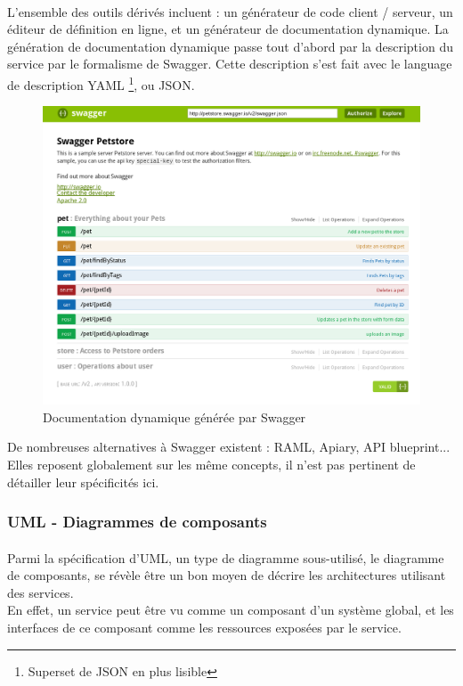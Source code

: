         \paragraph{}
            L'ensemble des outils dérivés incluent : un générateur de code client / serveur, un éditeur
            de définition en ligne, et un générateur de documentation dynamique.
            La génération de documentation dynamique passe tout d'abord par la description du service
            par le formalisme de Swagger. Cette description s'est fait avec le language de description YAML
            \footnote{Superset de JSON en plus lisible}, ou JSON.

        \begin{figure}[ht]
            \centering
            \includegraphics[scale=0.4]{./assets/swagger.png}
            \caption{Documentation dynamique générée par Swagger}
        \end{figure}

    De nombreuses alternatives à Swagger existent : RAML, Apiary, API blueprint... Elles reposent
    globalement sur les même concepts, il n'est pas pertinent de détailler leur spécificités ici.

    \newpage
    \subsubsection{UML - Diagrammes de composants}
        \paragraph{}
            Parmi la spécification d'UML, un type de diagramme sous-utilisé, le diagramme de composants,
            se révèle être un bon moyen de décrire les architectures utilisant des services.\\
            En effet, un service peut être vu comme un composant d'un système global, et les interfaces
            de ce composant comme les ressources exposées par le service.

